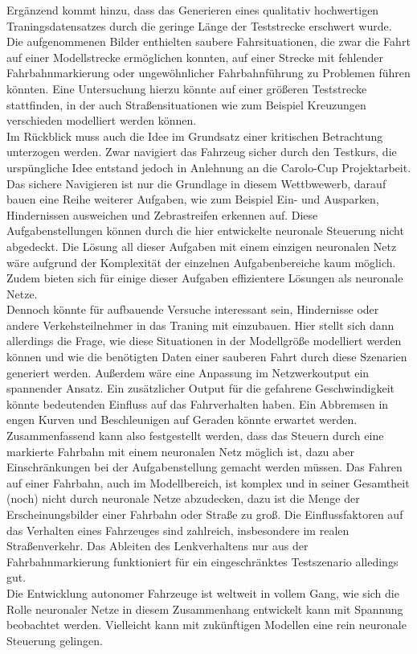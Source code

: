 Ergänzend kommt hinzu, dass das Generieren eines qualitativ hochwertigen Traningsdatensatzes durch die geringe Länge der Teststrecke erschwert wurde. Die aufgenommenen Bilder enthielten saubere Fahrsituationen, die zwar die Fahrt auf einer Modellstrecke ermöglichen konnten, auf einer Strecke mit fehlender Fahrbahnmarkierung oder ungewöhnlicher Fahrbahnführung zu Problemen führen könnten. Eine Untersuchung hierzu könnte auf einer größeren Teststrecke stattfinden, in der auch Straßensituationen wie zum Beispiel Kreuzungen verschieden modelliert werden können.\\ 
Im Rückblick muss auch die Idee im Grundsatz einer kritischen Betrachtung unterzogen werden. Zwar navigiert das Fahrzeug sicher durch den Testkurs, die urspüngliche Idee entstand jedoch in Anlehnung an die Carolo-Cup Projektarbeit. Das sichere Navigieren ist nur die Grundlage in diesem Wettbwewerb, darauf bauen eine Reihe weiterer Aufgaben, wie zum Beispiel Ein- und Ausparken, Hindernissen ausweichen und Zebrastreifen erkennen auf. Diese Aufgabenstellungen können durch die hier entwickelte neuronale Steuerung nicht abgedeckt. Die Lösung all dieser Aufgaben mit einem einzigen neuronalen Netz wäre aufgrund der Komplexität der einzelnen Aufgabenbereiche kaum möglich. Zudem bieten sich für einige dieser Aufgaben effizientere Lösungen als neuronale Netze.\\
Dennoch könnte für aufbauende Versuche interessant sein, Hindernisse oder andere Verkehsteilnehmer in das Traning mit einzubauen. Hier stellt sich dann allerdings die Frage, wie diese Situationen in der Modellgröße modelliert werden können und wie die benötigten Daten einer sauberen Fahrt durch diese Szenarien generiert werden. Außerdem wäre eine Anpassung im Netzwerkoutput ein spannender Ansatz. Ein zusätzlicher Output für die gefahrene Geschwindigkeit könnte bedeutenden Einfluss auf das Fahrverhalten haben. Ein Abbremsen in engen Kurven und Beschleunigen auf Geraden könnte erwartet werden.\\
Zusammenfassend kann also festgestellt werden, dass das Steuern durch eine markierte Fahrbahn mit einem neuronalen Netz möglich ist, dazu aber Einschränkungen bei der Aufgabenstellung gemacht werden müssen. Das Fahren auf einer Fahrbahn, auch im Modellbereich, ist komplex und in seiner Gesamtheit (noch) nicht durch neuronale Netze abzudecken, dazu ist die Menge der Erscheinungsbilder einer Fahrbahn oder Straße zu groß. Die Einflussfaktoren auf das Verhalten eines Fahrzeuges sind zahlreich, insbesondere im realen Straßenverkehr. Das Ableiten des Lenkverhaltens nur aus der Fahrbahnmarkierung funktioniert für ein eingeschränktes Testszenario alledings gut.\\
Die Entwicklung autonomer Fahrzeuge ist weltweit in vollem Gang, wie sich die Rolle neuronaler Netze in diesem Zusammenhang entwickelt kann mit Spannung beobachtet werden. Vielleicht kann mit zukünftigen Modellen eine rein neuronale Steuerung gelingen.


